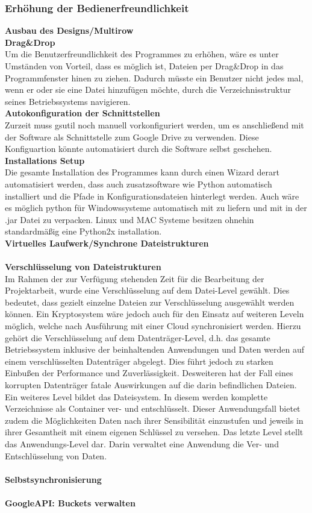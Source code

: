 \documentclass[12pt,a4paper,bibliography=totocnumbered,listof=totocnumbered]{scrartcl}
\begin{document}
\subsubsection{Erhöhung der Bedienerfreundlichkeit}
\textbf{Ausbau des Designs/Multirow}
\\\textbf{Drag\&Drop}\\
Um die Benutzerfreundlichkeit des Programmes zu erhöhen, wäre es unter Umständen von Vorteil, dass es möglich ist, Dateien per Drag\&Drop in das Programmfenster hinen zu ziehen. Dadurch müsste ein Benutzer nicht jedes mal, wenn er oder sie eine Datei hinzufügen möchte, durch die Verzeichnisstruktur seines Betriebssystems navigieren.
\\\textbf{Autokonfiguration der Schnittstellen}\\
Zurzeit muss gsutil noch manuell vorkonfiguriert werden, um es anschließend mit der Software als Schnittstelle zum Google Drive zu verwenden. Diese Konfiguartion könnte automatisiert durch die Software selbst geschehen.
\\\textbf{Installations Setup}\\
Die gesamte Installation des Programmes kann durch einen Wizard derart automatisiert werden, dass auch zusatzsoftware wie Python automatisch installiert und die Pfade in Konfigurationsdateien hinterlegt werden. Auch wäre es möglich python für Windowssysteme automatisch mit zu liefern und mit in der .jar Datei zu verpacken. Linux und MAC Systeme besitzen ohnehin standardmäßig eine Python2x installation.
\\\textbf{Virtuelles Laufwerk/Synchrone Dateistrukturen}\\
\\\textbf{Verschlüsselung von Dateistrukturen}\\
Im Rahmen der zur Verfügung stehenden Zeit für die Bearbeitung der Projektarbeit, wurde eine Verschlüsselung auf dem Datei-Level gewählt. Dies bedeutet, dass gezielt einzelne Dateien zur Verschlüsselung ausgewählt werden können. Ein Kryptosystem wäre jedoch auch für den Einsatz auf weiteren Leveln möglich, welche nach Ausführung mit einer Cloud synchronisiert werden. Hierzu gehört die Verschlüsselung auf dem Datenträger-Level, d.h. das gesamte Betriebssystem inklusive der beinhaltenden Anwendungen und Daten werden auf einem verschlüsselten Datenträger abgelegt. Dies führt jedoch zu starken Einbußen der Performance und Zuverlässigkeit. Desweiteren hat der Fall eines korrupten Datenträger fatale Auswirkungen auf die darin befindlichen Dateien. Ein weiteres Level bildet das Dateisystem. In diesem werden komplette Verzeichnisse als Container ver- und entschlüsselt. Dieser Anwendungsfall bietet zudem die Möglichkeiten Daten nach ihrer Sensibilität einzustufen und jeweils in ihrer Gesamtheit mit einem eigenen Schlüssel zu versehen. Das letzte Level stellt das Anwendungs-Level dar. Darin verwaltet eine Anwendung die Ver- und Entschlüsselung von Daten. \\
\cite{38}
\\\textbf{Selbstsynchronisierung}\\
\\\textbf{GoogleAPI: Buckets verwalten}\\
\end{document}
